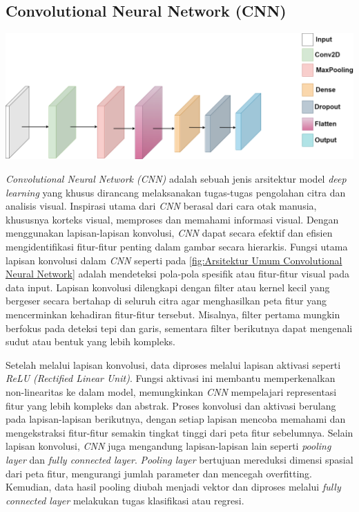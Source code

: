 \subsection{Convolutional Neural Network (CNN)}
\begin{table}[hbt!]
  \includegraphics[width=0.8\linewidth]{gambar/bener/Arsitektur_CNN_Umum.png}
  \label{fig:Arsitektur Umum Convolutional Neural Network}
\end{table}
\textit{Convolutional Neural Network (CNN)} adalah sebuah jenis arsitektur model \textit{deep learning} yang khusus dirancang melaksanakan tugas-tugas pengolahan citra dan analisis visual. Inspirasi utama dari \textit{CNN} berasal dari cara otak manusia, khususnya korteks visual, memproses dan memahami informasi visual. Dengan menggunakan lapisan-lapisan konvolusi, \textit{CNN} dapat secara efektif dan efisien mengidentifikasi fitur-fitur penting dalam gambar secara hierarkis. Fungsi utama lapisan konvolusi dalam \textit{CNN} seperti pada \ref{fig:Arsitektur Umum Convolutional Neural Network}
adalah mendeteksi pola-pola spesifik atau fitur-fitur visual pada data input. Lapisan konvolusi dilengkapi dengan filter atau kernel kecil yang bergeser secara bertahap di seluruh citra agar menghasilkan peta fitur yang mencerminkan kehadiran fitur-fitur tersebut. Misalnya, filter pertama mungkin berfokus pada deteksi tepi dan garis, sementara filter berikutnya dapat mengenali sudut atau bentuk yang lebih kompleks. \cite{wu2017introduction}

Setelah melalui lapisan konvolusi, data diproses melalui lapisan aktivasi seperti \textit{ReLU (Rectified Linear Unit)}. Fungsi aktivasi ini membantu memperkenalkan non-linearitas ke dalam model, memungkinkan \textit{CNN} mempelajari representasi fitur yang lebih kompleks dan abstrak. Proses konvolusi dan aktivasi berulang pada lapisan-lapisan berikutnya, dengan setiap lapisan mencoba memahami dan mengekstraksi fitur-fitur semakin tingkat tinggi dari peta fitur sebelumnya. Selain lapisan konvolusi, \textit{CNN} juga mengandung lapisan-lapisan lain seperti \textit{pooling layer} dan \textit{fully connected layer}. \textit{Pooling layer} bertujuan mereduksi dimensi spasial dari peta fitur, mengurangi jumlah parameter dan mencegah overfitting. Kemudian, data hasil pooling diubah menjadi vektor dan diproses melalui \textit{fully connected layer} melakukan tugas klasifikasi atau regresi. \cite{koushik2016understanding}


